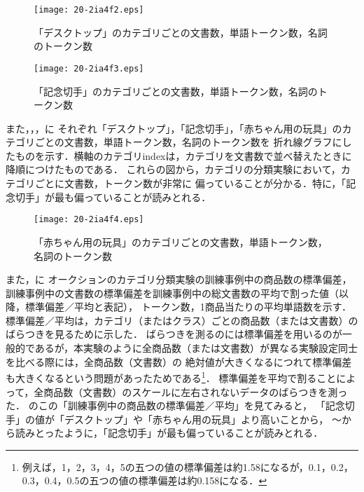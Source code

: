 \documentclass[japanese]{jnlp_1.4}
\newcommand{\figref}[1]{}
\newcommand{\tabref}[1]{}
\begin{document}
\begin{figure}[b]
\begin{center}
\texttt{[image: 20-2ia4f2.eps]}
\end{center}
\caption{「デスクトップ」のカテゴリごとの文書数，単語トークン数，名詞のトークン数}
\label{Fig:pc}
\end{figure}
\begin{figure}[b]
\begin{center}
\texttt{[image: 20-2ia4f3.eps]}
\end{center}
\caption{「記念切手」のカテゴリごとの文書数，単語トークン数，名詞のトークン数}
\label{Fig:stamp}
\end{figure}

また，\figref{Fig:pc}，\figref{Fig:stamp}，\figref{Fig:toy}に
それぞれ「デスクトップ」，「記念切手」，「赤ちゃん用の玩具」のカテゴリごとの文書数，単語トークン数，名詞のトークン数を
折れ線グラフにしたものを示す．横軸のカテゴリindexは，カテゴリを文書数で並べ替えたときに降順につけたものである．
これらの図から，カテゴリの分類実験において，カテゴリごとに文書数，トークン数が非常に
偏っていることが分かる．特に，「記念切手」が最も偏っていることが読みとれる．

\begin{figure}[t]
\begin{center}
\texttt{[image: 20-2ia4f4.eps]}
\end{center}
\caption{「赤ちゃん用の玩具」のカテゴリごとの文書数，単語トークン数，名詞のトークン数}
\label{Fig:toy}
\end{figure}
\begin{table}[t]
\label{Tab:オークションのカテゴリ分類実験のデータ}

\end{table}


また，\tabref{Tab:オークションのカテゴリ分類実験のデータ}に
オークションのカテゴリ分類実験の訓練事例中の商品数の標準偏差，訓練事例中の文書数の標準偏差を訓練事例中の総文書数の平均で割った値（以降，標準偏差／平均と表記），
トークン数，1商品当たりの平均単語数を示す．
標準偏差／平均は，カテゴリ（またはクラス）ごとの商品数（または文書数）のばらつきを見るために示した．
ばらつきを測るのには標準偏差を用いるのが一般的であるが，本実験のように全商品数（または文書数）が異なる実験設定同士を比べる際には，全商品数（文書数）の
絶対値が大きくなるにつれて標準偏差も大きくなるという問題があったためである\footnote{例えば，1，2，3，4，5の五つの値の標準偏差は約1.58になるが，0.1，0.2，0.3，0.4，0.5の五つの値の標準偏差は約0.158になる．}．
標準偏差を平均で割ることによって，全商品数（文書数）のスケールに左右されないデータのばらつきを測った．
\tabref{Tab:オークションのカテゴリ分類実験のデータ}のこの「訓練事例中の商品数の標準偏差／平均」を見てみると，
「記念切手」の値が「デスクトップ」や「赤ちゃん用の玩具」より高いことから，
\figref{Fig:pc}〜\figref{Fig:toy}から読みとったように，「記念切手」が最も偏っていることが読みとれる．
\end{document}
